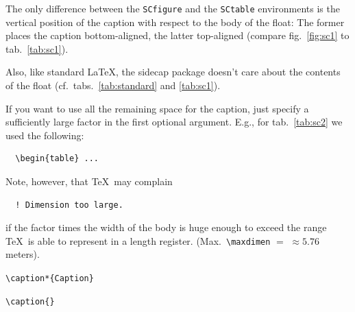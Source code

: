 \documentclass[a4paper]{article}
\begin{document}
The only difference between the \verb|SCfigure| and the
\verb|SCtable| environments is the vertical position of the
caption with respect to the body of the float:
The former places the caption bottom-aligned, the latter top-aligned
(compare fig.~\ref{fig:sc1} to tab.~\ref{tab:sc1}).

Also, like standard \LaTeX, the \textsf{sidecap} package doesn't care
about the contents of the float (cf.\ tabs.~\ref{tab:standard} and
\ref{tab:sc1}).

\begin{table}
  \caption[\SHORTCAPi]{\CAPi}  
  \label{tab:sc1}
\end{table}

If you want to use all the remaining space for the caption, just
specify a sufficiently large factor in the first optional argument.
E.g., for tab.~\ref{tab:sc2} we used the following:
%
\begin{verbatim}
  \begin{table} ...
\end{verbatim}
%
Note, however, that \TeX\ may complain
%
\begin{verbatim}
  ! Dimension too large.
\end{verbatim}
%
if the factor times the width of the body is huge enough to exceed
the range \TeX\ is able to represent in a length register.
%
(Max.\ \verb|\maxdimen|%
${}={}$\the\maxdimen
${}\approx 5.76$\,{meters}).


\begin{table}
\captionsetup{font=,labelfont=sf}
\captionsetup{margin=10pt}
  \caption[]{\CAPi}
  \label{tab:sc2}
\end{table}

\verb|\caption*{Caption}|
\begin{figure}
  \caption*{\CAPi}
\end{figure}

\verb|\caption{}|
\begin{figure}
  \caption{}
\end{figure}

\captionsetup[figure]{margin=5cm}

\begin{figure}%
  \caption{\CAPi}
\end{figure}
\end{document}
